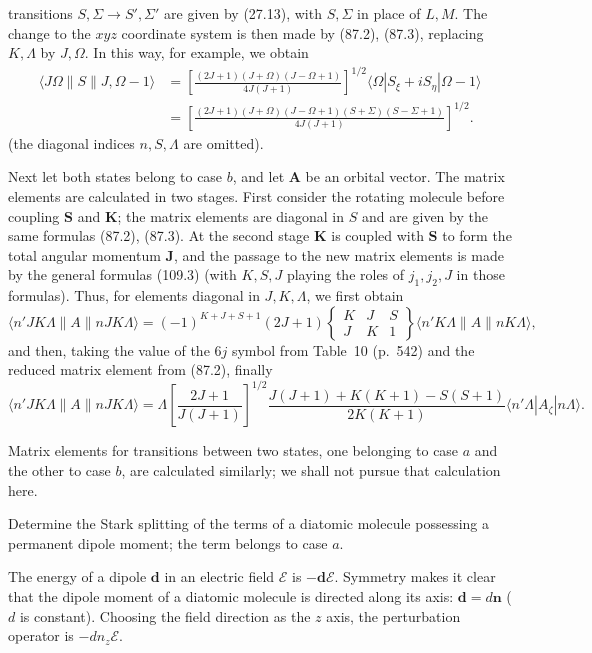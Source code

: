 transitions $S,\Sigma\to S',\Sigma'$ are given by (27.13), with $S,\Sigma$ in place of $L,M$. The change to the $xyz$ coordinate system is then made by (87.2), (87.3), replacing $K,\Lambda$ by $J,\Omega$. In this way, for example, we obtain
\begin{equation}
\begin{split}
\langle J\Omega\|S\|J,\Omega-1\rangle
&=\left[\frac{(2J+1)(J+\Omega)(J-\Omega+1)}{4J(J+1)}\right]^{1/2}
\langle\Omega|S_\xi+iS_\eta|\Omega-1\rangle\\
&=\left[\frac{(2J+1)(J+\Omega)(J-\Omega+1)(S+\Sigma)(S-\Sigma+1)}{4J(J+1)}\right]^{1/2}.
\end{split}
\tag{87.5}
\end{equation}
(the diagonal indices $n,S,\Lambda$ are omitted).

Next let both states belong to case $b$, and let $\mathbf A$ be an orbital vector. The matrix elements are calculated in two stages. First consider the rotating molecule before coupling $\mathbf S$ and $\mathbf K$; the matrix elements are diagonal in $S$ and are given by the same formulas (87.2), (87.3). At the second stage $\mathbf K$ is coupled with $\mathbf S$ to form the total angular momentum $\mathbf J$, and the passage to the new matrix elements is made by the general formulas (109.3) (with $K,S,J$ playing the roles of $j_1,j_2,J$ in those formulas). Thus, for elements diagonal in $J,K,\Lambda$, we first obtain
\[
\langle n'JK\Lambda\|A\|nJK\Lambda\rangle
=(-1)^{K+J+S+1}(2J+1)
\begin{Bmatrix}K&J&S\\J&K&1\end{Bmatrix}
\langle n'K\Lambda\|A\|nK\Lambda\rangle,
\]
and then, taking the value of the $6j$ symbol from Table~10 (p.~542) and the reduced matrix element from (87.2), finally
\[
\langle n'JK\Lambda\|A\|nJK\Lambda\rangle
=\Lambda\left[\frac{2J+1}{J(J+1)}\right]^{1/2}
\frac{J(J+1)+K(K+1)-S(S+1)}{2K(K+1)}
\langle n'\Lambda|A_\zeta|n\Lambda\rangle.
\]

Matrix elements for transitions between two states, one belonging to case $a$ and the other to case $b$, are calculated similarly; we shall not pursue that calculation here.

\ProblemHeading[1] Determine the Stark splitting of the terms of a diatomic molecule possessing a permanent dipole moment; the term belongs to case $a$.

\SolutionHeading The energy of a dipole $\mathbf d$ in an electric field $\boldsymbol{\mathcal E}$ is $-\mathbf d\boldsymbol{\mathcal E}$. Symmetry makes it clear that the dipole moment of a diatomic molecule is directed along its axis: $\mathbf d=d\mathbf n$ ($d$ is constant). Choosing the field direction as the $z$ axis, the perturbation operator is $-dn_z\mathcal E$.

